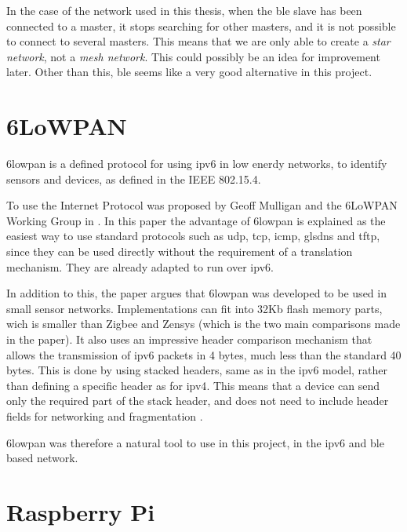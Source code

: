 In the case of the network used in this thesis, when the \gls{ble} slave has been connected to a master, it stops searching for other masters, and it is not possible to connect to several masters. This means that we are only able to create a \textit{star network}, not a \textit{mesh network}. This could possibly be an idea for improvement later. Other than this, \gls{ble} seems like a very good alternative in this project. 


\section{6LoWPAN}


\gls{6lowpan} is a defined protocol for using \gls{ipv6} in low enerdy networks, to identify sensors and devices, as defined in the IEEE 802.15.4. 

To use the Internet Protocol was proposed by Geoff Mulligan and the 6LoWPAN Working Group in \cite{mulligan20076lowpan}. In this paper the advantage of \gls{6lowpan} is explained as the easiest way to use standard protocols such as \gls{udp}, \gls{tcp}, \gls{icmp}, gls{dns} and \gls{tftp}, since they can be used directly without the requirement of a translation mechanism. They are already adapted to run over \gls{ipv6}. 

In addition to this, the paper argues that \gls{6lowpan} was developed to be used in small sensor networks. Implementations can fit into 32Kb flash memory parts, wich is smaller than Zigbee and Zensys (which is the two main comparisons made in the paper). It also uses an impressive header comparison mechanism that allows the transmission of \gls{ipv6} packets in 4 bytes, much less than the standard 40 bytes. This is done by using stacked headers, same as in the \gls{ipv6} model, rather than defining a specific header as for \gls{ipv4}. This means that a device can send only the required part of the stack header, and does not need to include header fields for networking and fragmentation \cite{hui2008extending}. 

\gls{6lowpan} was therefore a natural tool to use in this project, in the \gls{ipv6} and \gls{ble} based network. 


\section{Raspberry Pi}

